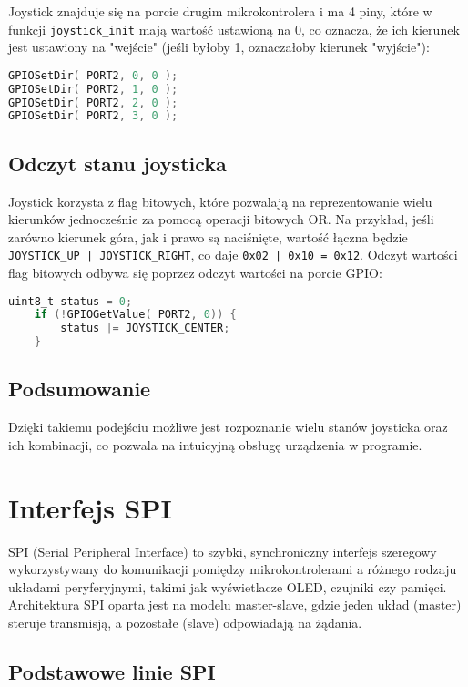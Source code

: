 \documentclass[letterpaper,11pt]{report}
\begin{document}
Joystick znajduje się na porcie drugim mikrokontrolera i ma 4 piny, które w funkcji \texttt{joystick\_init} mają wartość ustawioną na 0, co oznacza, że ich kierunek jest ustawiony na "wejście" (jeśli byłoby 1, oznaczałoby kierunek "wyjście"):
\begin{lstlisting}[language=C]
GPIOSetDir( PORT2, 0, 0 );
GPIOSetDir( PORT2, 1, 0 );
GPIOSetDir( PORT2, 2, 0 );
GPIOSetDir( PORT2, 3, 0 );
\end{lstlisting}

\subsection{Odczyt stanu joysticka}

Joystick korzysta z flag bitowych, które pozwalają na reprezentowanie wielu kierunków jednocześnie za pomocą operacji bitowych OR. Na przykład, jeśli zarówno kierunek góra, jak i prawo są naciśnięte, wartość łączna będzie \texttt{JOYSTICK\_UP | JOYSTICK\_RIGHT}, co daje \texttt{0x02 | 0x10 = 0x12}.
Odczyt wartości flag bitowych odbywa się poprzez odczyt wartości na porcie GPIO:
\begin{lstlisting}[language=C]
    uint8_t status = 0;
    if (!GPIOGetValue( PORT2, 0)) {
        status |= JOYSTICK_CENTER;
    }

\end{lstlisting}
\subsection*{Podsumowanie}

Dzięki takiemu podejściu możliwe jest rozpoznanie wielu stanów joysticka oraz ich kombinacji, co pozwala na intuicyjną obsługę urządzenia w programie.

\section{Interfejs SPI}

SPI (Serial Peripheral Interface) to szybki, synchroniczny interfejs szeregowy wykorzystywany do komunikacji pomiędzy mikrokontrolerami a różnego rodzaju układami peryferyjnymi, takimi jak wyświetlacze OLED, czujniki czy pamięci. Architektura SPI oparta jest na modelu master-slave, gdzie jeden układ (master) steruje transmisją, a pozostałe (slave) odpowiadają na żądania.

\subsection{Podstawowe linie SPI}
\end{document}
